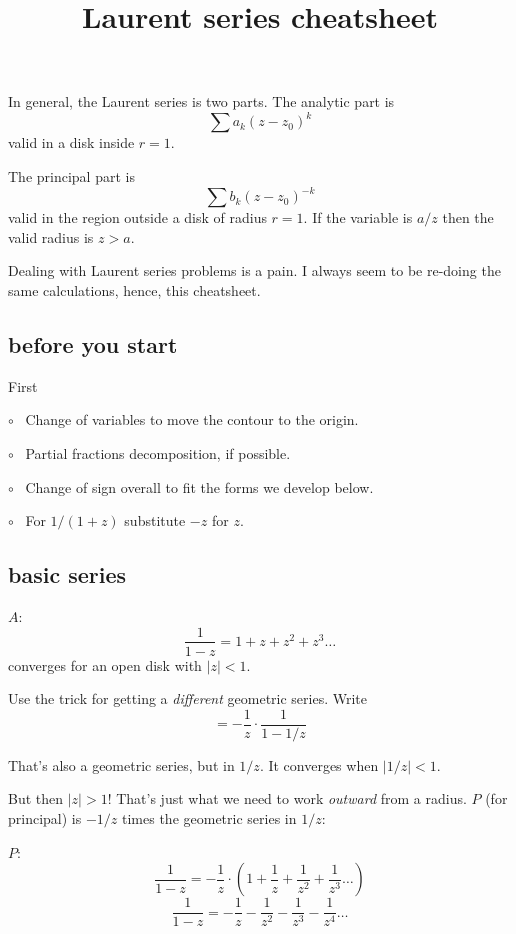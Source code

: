 \documentclass[11pt, oneside]{article}
\title{Laurent series cheatsheet}
\date{}
\begin{document}
\maketitle
\Large


\label{sec:series_cheatsheet}

In general, the Laurent series is two parts.  The analytic part is
\[ \sum a_k (z - z_0)^k \]
valid in a disk inside $r = 1$.

The principal part is
\[ \sum b_k (z - z_0)^{-k} \]
valid in the region outside a disk of radius $r = 1$.  If the variable is $a/z$ then the valid radius is $z > a$.

Dealing with Laurent series problems is a pain.  I always seem to be re-doing the same calculations, hence, this cheatsheet.

\subsection*{before you start}

First 

$\circ$ \ Change of variables to move the contour to the origin.

$\circ$ \ Partial fractions decomposition, if possible.

$\circ$ \ Change of sign overall to fit the forms we develop below.

$\circ$ \ For $1/(1 + z)$ substitute $-z$ for $z$.

\subsection*{basic series}

$A$:
\[ \frac{1}{1 - z} = 1 + z + z^2 + z^3 \dots \]
converges for an open disk with $|z| < 1$.

Use the trick for getting a \emph{different} geometric series.  Write
\[ = -\frac{1}{z} \cdot \frac{1}{1 - 1/z} \]

That's also a geometric series, but in $1/z$.  It converges when $|1/z| < 1$.

But then $|z| > 1$!  That's just what we need to work \emph{outward} from a radius.  $P$ (for principal) is $-1/z$ times the geometric series in $1/z$:

$P$:
\[ \frac{1}{1 - z} = -\frac{1}{z} \cdot (1 + \frac{1}{z} + \frac{1}{z^2} + \frac{1}{z^3} \dots ) \]
\[ \frac{1}{1 - z} = - \frac{1}{z} - \frac{1}{z^2} - \frac{1}{z^3}  - \frac{1}{z^4} \dots \]
\end{document}
